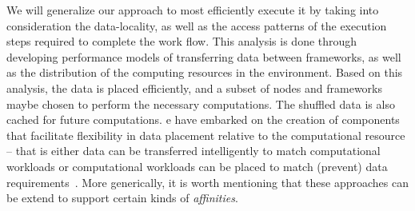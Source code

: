 \documentclass[3p,twocolumn]{elsarticle}
\begin{document}
We will generalize our approach to most efficiently execute it by
taking into consideration the data-locality, as well as the access
patterns of the execution steps required to complete the work
flow. This analysis is done through developing performance models of
transferring data between frameworks, as well as the distribution of
the computing resources in the environment. Based on this analysis,
the data is placed efficiently, and a subset of nodes and frameworks
maybe chosen to perform the necessary computations. The shuffled data
is also cached for future computations.  e have embarked on the
creation of components that facilitate flexibility in data placement
relative to the computational resource -- that is either data can be
transferred intelligently to match computational workloads or
computational workloads can be placed to match (prevent) data
requirements~\cite{???}. More generically, it is worth mentioning that
these approaches can be extend to support certain kinds of {\it
  affinities}.




\end{document}
